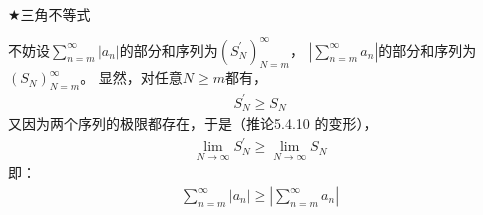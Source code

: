 \documentclass{article}
\theoremstyle{mystyle}
\begin{document}
$\bigstar \text{三角不等式}$

不妨设$\sum \limits_{n=m} ^{\infty} |a_n|$的部分和序列为$(S_N^\prime)_{N=m}^{\infty}$，
$|\sum \limits_{n=m} ^{\infty} a_n|$的部分和序列为$(S_N)_{N=m}^{\infty}$。
显然，对任意$N \geq m$都有，
\begin{align*}
  S_N^\prime \geq S_N
\end{align*}
又因为两个序列的极限都存在，于是（推论5.4.10 的变形），
\begin{align*}
  \lim \limits_{N \rightarrow \infty} S_N^\prime
  \geq \lim \limits_{N \rightarrow \infty} S_N
\end{align*}
即：
\begin{align*}
  \sum \limits_{n=m} ^{\infty} |a_n| \geq |\sum \limits_{n=m} ^{\infty} a_n|
\end{align*}
\end{document}
